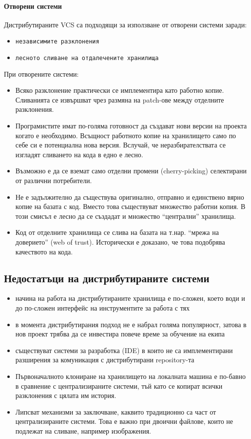 \documentclass[a4paper]{article}
\begin{document}
    \paragraph{Отворени системи}
      Дистрибутираните VCS са подходящи за използване от отворени системи заради:
      \begin{itemize}
        \item \texttt{независимите разклонения}
        \item \texttt{лесното сливане на отдалечените хранилища}
      \end{itemize}

      При отворените системи:
      \begin{itemize}
        \item Всяко разклонение практически се имплементира като работно копие. Сливанията се извършват чрез размяна на patch-ове между отделните разклонения.
        \item Програмистите имат по-голяма готовност да създават нови версии на проекта когато е необходимо. Всъщност работното копие на хранилището само по себе си е потенциална нова версия. Вслучай, че неразбирателствата се изгладят сливането на кода в едно е лесно.
        \item Възможно е да се вземат само отделни промени (cherry-picking) селектирани от различни потребители.
        \item Не е задължително да съществува оригинално, отправно и единствено вярно копие на базата с код. Вместо това съществуват множество работни копия. В този смисъл е лесно да се създадат и множество ``централни'' хранилища.
        \item Код от отделните хранилища се слива на базата на т.нар. ``мрежа на доверието'' (web of trust). Исторически е доказано, че това подобрява качеството на кода.
      \end{itemize}

  \subsection{Недостатъци на дистрибутираните системи}
    \begin{itemize}
      \item начина на работа на дистрибутираните хранилища е по-сложен, което
      води и до по-сложен интерфейс на инструментите за работа с тях
      \item в момента дистрибутирания подход не е набрал голяма популярност,
      затова в нов проект трябва да се инвестира повече време за обучение на
      екипа
      \item съществуват системи за разработка (IDE) в които не са
      имплементирани разширения за комуникация с дистрибутирани repository-та
      \item Първоначалното клониране на хранилището на локалната машина
      е по-бавно в сравнение с централизираните системи, тъй като се копират
      всички разклонения с цялата им история.
      \item Липсват механизми за заключване, каквито традиционно са част от
      централизираните системи. Това е важно при двоични файлове, които не
      подлежат на сливане, например изображения.
    \end{itemize}
\end{document}
